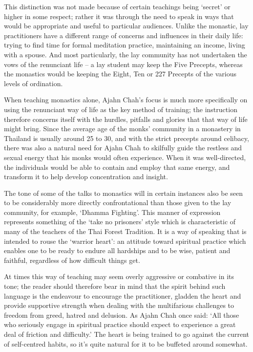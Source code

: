 This distinction was not made because of certain teachings being `secret' or higher in some respect; rather it was through the need to speak in ways that would be appropriate and useful to particular audiences. Unlike the monastic, lay practitioners have a different range of concerns and influences in their daily life: trying to find time for formal meditation practice, maintaining an income, living with a spouse. And most particularly, the lay community has not undertaken the vows of the renunciant life -- a lay student may keep the Five Precepts, whereas the monastics would be keeping the Eight, Ten or 227 Precepts of the various levels of ordination.

When teaching monastics alone, Ajahn Chah's focus is much more specifically on using the renunciant way of life as the key method of training; the instruction therefore concerns itself with the hurdles, pitfalls and glories that that way of life might bring. Since the average age of the monks' community in a monastery in Thailand is usually around 25 to 30, and with the strict precepts around celibacy, there was also a natural need for Ajahn Chah to skilfully guide the restless and sexual energy that his monks would often experience. When it was well-directed, the individuals would be able to contain and employ that same energy, and transform it to help develop concentration and insight.

The tone of some of the talks to monastics will in certain instances also be seen to be considerably more directly confrontational than those given to the lay community, for example, `Dhamma Fighting'. This manner of expression represents something of the `take no prisoners' style which is characteristic of many of the teachers of the Thai Forest Tradition. It is a way of speaking that is intended to rouse the `warrior heart': an attitude toward spiritual practice which enables one to be ready to endure all hardships and to be wise, patient and faithful, regardless of how difficult things get.

At times this way of teaching may seem overly aggressive or combative in its tone; the reader should therefore bear in mind that the spirit behind such language is the endeavour to encourage the practitioner, gladden the heart and provide supportive strength when dealing with the multifarious challenges to freedom from greed, hatred and delusion. As Ajahn Chah once said: `All those who seriously engage in spiritual practice should expect to experience a great deal of friction and difficulty.' The heart is being trained to go against the current of self-centred habits, so it's quite natural for it to be buffeted around somewhat.

